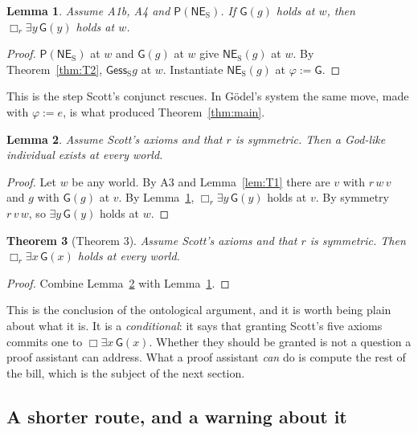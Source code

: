 \documentclass[11pt]{article}
\theoremstyle{plain}
\newtheorem{theorem}{Theorem}
\newtheorem{lemma}[theorem]{Lemma}
\theoremstyle{definition}
\newcommand{\esss}{\mathrel{\mathsf{ess}_{\mathrm{S}}}}
\newcommand{\NES}{\mathsf{NE}_{\mathrm{S}}}
\newcommand{\Gd}{\mathsf{G}}
\newcommand{\Pos}{\mathsf{P}}
\begin{document}
\begin{lemma}\label{lem:boxgod}
Assume {\rm A1b}, {\rm A4} and $\Pos(\NES)$. If $\Gd(g)$ holds at $w$, then
$\Box_r \exists y\, \Gd(y)$ holds at $w$.
\end{lemma}

\begin{proof}
$\Pos(\NES)$ at $w$ and $\Gd(g)$ at $w$ give $\NES(g)$ at $w$. By
Theorem~\ref{thm:T2}, $\Gd \esss g$ at $w$. Instantiate $\NES(g)$ at
$\varphi := \Gd$.
\end{proof}

\noindent
This is the step Scott's conjunct rescues. In G\"odel's system the same move,
made with $\varphi := e$, is what produced Theorem~\ref{thm:main}.

\begin{lemma}\label{lem:existsgod}
Assume Scott's axioms and that $r$ is \emph{symmetric}. Then a God-like
individual exists at every world.
\end{lemma}

\begin{proof}
Let $w$ be any world. By A3 and Lemma~\ref{lem:T1} there are $v$ with $r\,w\,v$
and $g$ with $\Gd(g)$ at $v$. By Lemma~\ref{lem:boxgod},
$\Box_r \exists y\, \Gd(y)$ holds at $v$. By symmetry $r\,v\,w$, so
$\exists y\, \Gd(y)$ holds at $w$.
\end{proof}

\begin{theorem}[Theorem 3]\label{thm:T3}
Assume Scott's axioms and that $r$ is symmetric. Then
$\Box_r \exists x\, \Gd(x)$ holds at every world.
\end{theorem}

\begin{proof}
Combine Lemma~\ref{lem:existsgod} with Lemma~\ref{lem:boxgod}.
\end{proof}

\noindent
This is the conclusion of the ontological argument, and it is worth being
plain about what it is. It is a \emph{conditional}: it says that granting
Scott's five axioms commits one to $\Box\exists x\,\Gd(x)$. Whether they should
be granted is not a question a proof assistant can address. What a proof
assistant \emph{can} do is compute the rest of the bill, which is the subject
of the next section.

\subsection{A shorter route, and a warning about it}\label{sec:shortcut}
\end{document}
